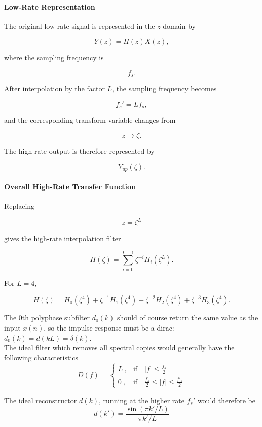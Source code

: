 \paragraph{Low-Rate Representation}

The original low-rate signal is represented in the $z$-domain by

\[
Y(z)=H(z)X(z),
\]

where the sampling frequency is

\[
f_s.
\]

After interpolation by the factor $L$, the sampling frequency becomes

\[
f_s'=Lf_s,
\]

and the corresponding transform variable changes from

\[
z
\longrightarrow
\zeta.
\]

The high-rate output is therefore represented by

\[
Y_{up}(\zeta).
\]

\paragraph{Overall High-Rate Transfer Function}

Replacing

\[
z=\zeta^L
\]

gives the high-rate interpolation filter

\[
\boxed{
H(\zeta)
=
\sum_{i=0}^{L-1}
\zeta^{-i}H_i(\zeta^L).
}
\]

For \(L=4\),

\[
H(\zeta)
=
H_0(\zeta^4)
+\zeta^{-1}H_1(\zeta^4)
+\zeta^{-2}H_2(\zeta^4)
+\zeta^{-3}H_3(\zeta^4).
\]

The 0th polyphase subfilter $d_0(k)$ should of course return the same value as
the input $x(n)$, so the impulse response must be a dirac:
$d_0(k) = d(kL) = \delta(k)$. \\

The ideal filter which removes all spectral copies would generally have
the following characteristics
\begin{equation*}
	D(f) = \begin{cases}
		L\:,	& \text{if} \quad |f|\leq\frac{f_s}{2} \\
		0\:,	& \text{if} \quad \frac{f_s}{2}\leq |f|\leq\frac{f'_s}{2}
	\end{cases}
\end{equation*}

The ideal reconstructor $d(k)$, running at the higher rate $f_s'$ would
therefore be
\begin{equation*}
	d(k') = \frac{\sin(\pi k' / L)}{\pi k' / L}
\end{equation*}

